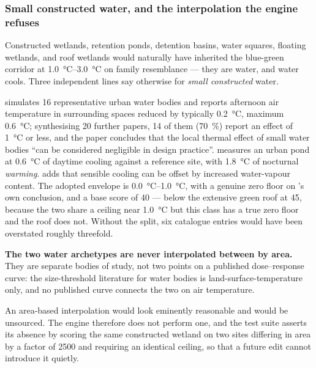 \subsubsection{Small constructed water, and the interpolation the engine refuses}
\label{sec:small-water}

Constructed wetlands, retention ponds, detention basins, water squares,
floating wetlands, and roof wetlands would naturally have inherited the
blue-green corridor at \SIrange{1.0}{3.0}{\degreeCelsius} on family resemblance
--- they are water, and water cools. Three independent lines say otherwise for
\emph{small constructed} water.

\textcite{jacobs2020} simulates 16 representative urban water bodies and reports
afternoon air temperature in surrounding spaces reduced by typically
\qty{0.2}{\degreeCelsius}, maximum \qty{0.6}{\degreeCelsius}; synthesising 20
further papers, 14 of them (\SI{70}{\percent}) report an effect of
\qty{1}{\degreeCelsius} or less, and the paper concludes that the local thermal
effect of small water bodies ``can be considered negligible in design
practice''. \textcite{yao2023b} measures an urban pond at
\qty{0.6}{\degreeCelsius} of daytime cooling against a reference site, with
\qty{1.8}{\degreeCelsius} of nocturnal \emph{warming}.
\textcite{ampatzidis2020} adds that sensible cooling can be offset by increased
water-vapour content. The adopted envelope is
\SIrange{0.0}{1.0}{\degreeCelsius}, with a genuine zero floor on
\textcite{jacobs2020}'s own conclusion, and a base score of 40 --- below the
extensive green roof at 45, because the two share a ceiling near
\qty{1.0}{\degreeCelsius} but this class has a true zero floor and the roof does
not. Without the split, six catalogue entries would have been overstated
roughly threefold.

\begin{keynote}
\noindent\textbf{The two water archetypes are never interpolated between by
area.} They are separate bodies of study, not two points on a published
dose--response curve: the size-threshold literature for water bodies is
land-surface-temperature only, and no published curve connects the two on air
temperature.

An area-based interpolation would look eminently reasonable and would be
unsourced. The engine therefore does not perform one, and the test suite asserts
its absence by scoring the same constructed wetland on two sites differing in
area by a factor of \num{2500} and requiring an identical ceiling, so that a
future edit cannot introduce it quietly.
\end{keynote}

